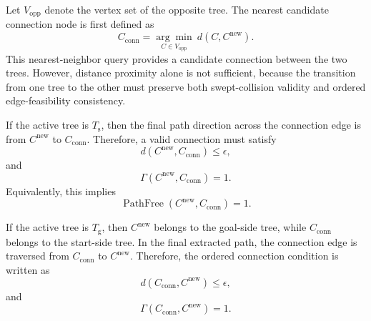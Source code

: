 \documentclass{pas}
\begin{document}
Let \(V_{\mathrm{opp}}\) denote the vertex set of the opposite tree. The nearest
candidate connection node is first defined as
\begin{equation}
C_{\mathrm{conn}}
=
\underset{C\in V_{\mathrm{opp}}}{\arg\min} \
d(C,C^{\mathrm{new}}).
\label{eq:gcr_connection_candidate}
\end{equation}
This nearest-neighbor query provides a candidate connection between the two
trees. However, distance proximity alone is not sufficient, because the
transition from one tree to the other must preserve both swept-collision
validity and ordered edge-feasibility consistency.

If the active tree is \(T_{\mathrm{s}}\), then the final path direction across
the connection edge is from \(C^{\mathrm{new}}\) to \(C_{\mathrm{conn}}\).
Therefore, a valid connection must satisfy
\begin{equation}
d(C^{\mathrm{new}},C_{\mathrm{conn}})
\leq
\epsilon,
\label{eq:gcr_connection_distance_condition}
\end{equation}
and
\begin{equation}
\Gamma(C^{\mathrm{new}},C_{\mathrm{conn}})=1.
\label{eq:gcr_connection_gamma_condition_start_active}
\end{equation}
Equivalently, this implies
\begin{equation}
\operatorname{PathFree}(C^{\mathrm{new}},C_{\mathrm{conn}})=1.
\label{eq:gcr_connection_pathfree_condition}
\end{equation}

If the active tree is \(T_{\mathrm{g}}\), then \(C^{\mathrm{new}}\) belongs to
the goal-side tree, while \(C_{\mathrm{conn}}\) belongs to the start-side tree.
In the final extracted path, the connection edge is traversed from
\(C_{\mathrm{conn}}\) to \(C^{\mathrm{new}}\). Therefore, the ordered
connection condition is written as
\begin{equation}
d(C_{\mathrm{conn}},C^{\mathrm{new}})
\leq
\epsilon,
\label{eq:gcr_connection_distance_condition_goal_active}
\end{equation}
and
\begin{equation}
\Gamma(C_{\mathrm{conn}},C^{\mathrm{new}})=1.
\label{eq:gcr_connection_gamma_condition_goal_active}
\end{equation}
\end{document}
